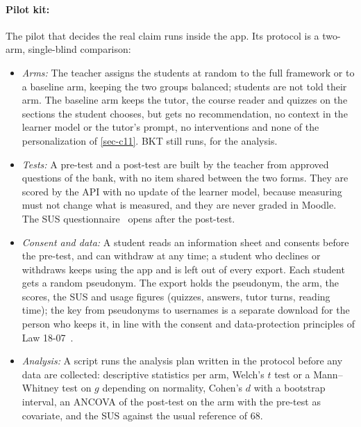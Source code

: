 \paragraph{Pilot kit:} The pilot that decides the real claim runs inside
the app. Its protocol is a two-arm, single-blind comparison:
\begin{itemize}
  \item \emph{Arms:} The teacher assigns the students at random to the
        full framework or to a baseline arm, keeping the two groups
        balanced; students are not told their arm. The baseline arm keeps
        the tutor, the course reader and quizzes on the sections the
        student chooses, but gets no recommendation, no context in the
        learner model or the tutor's prompt, no interventions and none of
        the personalization of \cref{sec-c11}. BKT still runs, for the
        analysis.
  \item \emph{Tests:} A pre-test and a post-test are built by the teacher
        from approved questions of the bank, with no item shared between
        the two forms. They are scored by the API with no update of the
        learner model, because measuring must not change what is measured,
        and they are never graded in Moodle. The SUS
        questionnaire~\cite{brooke1996sus} opens after the post-test.
  \item \emph{Consent and data:} A student reads an information sheet and
        consents before the pre-test, and can withdraw at any time; a
        student who declines or withdraws keeps using the app and is left
        out of every export. Each student gets a random pseudonym. The
        export holds the pseudonym, the arm, the scores, the SUS and usage
        figures (quizzes, answers, tutor turns, reading time); the key from
        pseudonyms to usernames is a separate download for the person who
        keeps it, in line with the consent and data-protection principles
        of Law 18-07~\cite{algeria_law1807}.
  \item \emph{Analysis:} A script runs the analysis plan written in the
        protocol before any data are collected:
        descriptive statistics per arm, Welch's $t$ test or a Mann--Whitney
        test on $g$ depending on normality, Cohen's $d$ with a bootstrap
        interval, an ANCOVA of the post-test on the arm with the pre-test
        as covariate, and the SUS against the usual reference of 68.
\end{itemize}

